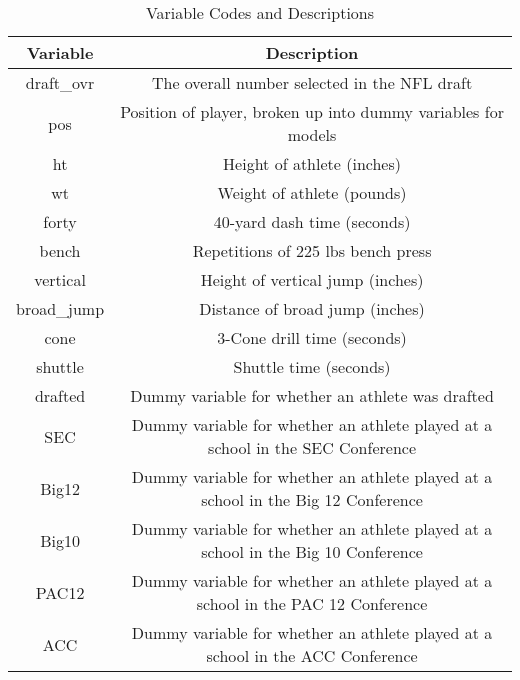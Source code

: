 \documentclass[12pt,english]{article}
\begin{document}
\begin{table}[ht]
\caption{Variable Codes and Descriptions}
\label{tab:descriptions} 
\begin{center}
 \begin{tabular}{|c|c|} 
 \hline
 \textbf{Variable} & \textbf{Description}  \\ [0.5ex] 
 \hline\hline
 draft\_ovr & The overall number selected in the NFL draft \\ 
 \hline 
 pos & Position of player, broken up into dummy variables for models \\
 \hline 
 ht & Height of athlete (inches) \\
\hline  
 wt & Weight of athlete (pounds)\\
 \hline 
 forty & 40-yard dash time (seconds) \\
\hline 
 bench & Repetitions of 225 lbs bench press \\
\hline 
 vertical & Height of vertical jump (inches) \\
\hline 
 broad\_jump & Distance of broad jump (inches) \\
\hline 
 cone & 3-Cone drill time (seconds) \\
\hline 
 shuttle & Shuttle time (seconds) \\
\hline 
 drafted & Dummy variable for whether an athlete was drafted \\
\hline  
 SEC & Dummy variable for whether an athlete played at a school in the SEC Conference \\
\hline  
 Big12 & Dummy variable for whether an athlete played at a school in the Big 12 Conference \\
 \hline 
 Big10 & Dummy variable for whether an athlete played at a school in the Big 10 Conference \\
\hline 
 PAC12 & Dummy variable for whether an athlete played at a school in the PAC 12 Conference \\
\hline 
 ACC & Dummy variable for whether an athlete played at a school in the ACC Conference \\
\hline
\end{tabular}
\end{center}
\end{table}
\end{document}

